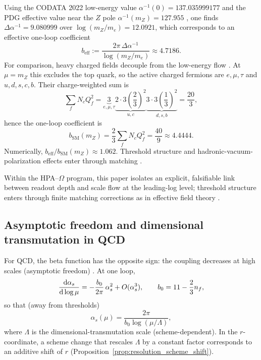 Using the CODATA 2022 low-energy value $\alpha^{-1}(0)=137.035999177$ and the PDG effective value near the $Z$ pole $\alpha^{-1}(m_Z)=127.955$ \cite{CODATA2022RMP,PDGRPP2024}, one finds $\Delta\alpha^{-1}=9.080999$ over $\log(m_Z/m_e)=12.0921$, which corresponds to an effective one-loop coefficient
\begin{equation}
b_{\mathrm{eff}}:=\frac{2\pi\,\Delta\alpha^{-1}}{\log(m_Z/m_e)}\approx 4.7186.
\end{equation}
For comparison, heavy charged fields decouple from the low-energy flow \cite{AppelquistCarazzone1975,PeskinSchroeder1995}. At $\mu=m_Z$ this excludes the top quark, so the active charged fermions are $e,\mu,\tau$ and $u,d,s,c,b$. Their charge-weighted sum is
\begin{equation}
\sum_f N_c Q_f^2
=\underbrace{3}_{e,\mu,\tau}
\underbrace{2\cdot 3\left(\frac{2}{3}\right)^2}_{u,c}
\underbrace{3\cdot 3\left(\frac{1}{3}\right)^2}_{d,s,b}
=\frac{20}{3},
\end{equation}
hence the one-loop coefficient is
\begin{equation}
b_{\mathrm{SM}}(m_Z)=\frac{2}{3}\sum_f N_c Q_f^2=\frac{40}{9}\approx 4.4444.
\end{equation}
Numerically, $b_{\mathrm{eff}}/b_{\mathrm{SM}}(m_Z)\approx 1.062$. Threshold structure and hadronic-vacuum-polarization effects enter through matching \cite{PeskinSchroeder1995,PDGRPP2024}.

Within the HPA--$\Omega$ program, this paper isolates an explicit, falsifiable link between readout depth and scale flow at the leading-log level; threshold structure enters through finite matching corrections as in effective field theory \cite{AppelquistCarazzone1975,PeskinSchroeder1995,PDGRPP2024}.

\subsection{Asymptotic freedom and dimensional transmutation in QCD}
For QCD, the beta function has the opposite sign: the coupling decreases at high scales (asymptotic freedom) \cite{GrossWilczek1973,Politzer1973,PeskinSchroeder1995}. At one loop,
\begin{equation}\label{eq:qcd_beta_one_loop}
\frac{\mathrm{d} \alpha_s}{\mathrm{d} \log\mu}=-\frac{b_0}{2\pi}\,\alpha_s^2+O(\alpha_s^3),
\qquad
b_0=11-\frac{2}{3}n_f,
\end{equation}
so that (away from thresholds)
\begin{equation}\label{eq:qcd_running_one_loop}
\alpha_s(\mu)=\frac{2\pi}{b_0\log(\mu/\Lambda)},
\end{equation}
where $\Lambda$ is the dimensional-transmutation scale (scheme-dependent). In the $r$-coordinate, a scheme change that rescales $\Lambda$ by a constant factor corresponds to an additive shift of $r$ (Proposition~\ref{prop:resolution_scheme_shift}).

